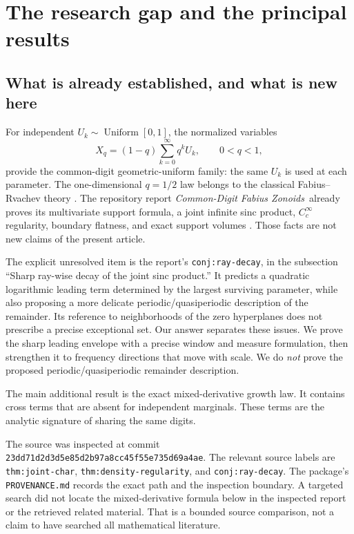 \documentclass[11pt,a4paper]{article}
\numberwithin{equation}{section}
\theoremstyle{definition}
\theoremstyle{remark}\newtheorem{remark}[theorem]{Remark}
\newcommand{\repo}{\textit{Common-Digit Fabius Zonoids}}
\begin{document}
\begingroup
\small
\setlength{\parskip}{0pt}
\tableofcontents
\endgroup
\clearpage

\section{The research gap and the principal results}
\label{sec:intro}

\subsection{What is already established, and what is new here}

For independent $U_k\sim\operatorname{Uniform}[0,1]$, the normalized variables
\begin{equation}
 X_q=(1-q)\sum_{k=0}^{\infty}q^kU_k,\qquad 0<q<1,
 \label{eq:normalized}
\end{equation}
provide the common-digit geometric-uniform family: the same $U_k$ is used at
each parameter. The one-dimensional $q=1/2$ law belongs to the classical
Fabius--Rvachev theory \cite{Fabius,Arias}. The repository report \repo\ already
proves its multivariate support formula, a joint infinite sinc product,
$C_c^\infty$ regularity, boundary flatness, and exact support volumes
\cite{Repo}. Those facts are not new claims of the present article.

The explicit unresolved item is the report's
\texttt{conj:ray-decay}, in the subsection ``Sharp ray-wise decay of the joint
sinc product.'' It predicts a quadratic logarithmic leading term determined
by the largest surviving parameter, while also proposing a more delicate
periodic/quasiperiodic description of the remainder. Its reference to
neighborhoods of the zero hyperplanes does not prescribe a precise exceptional
set. Our answer separates these issues. We prove the sharp leading envelope
with a precise window and measure formulation, then strengthen it to
frequency directions that move with scale. We do \emph{not} prove the proposed
periodic/quasiperiodic remainder description.

The main additional result is the exact mixed-derivative growth law. It
contains cross terms that are absent for independent marginals. These terms
are the analytic signature of sharing the same digits.

The source was inspected at commit \texttt{23dd71d2d3d5e85d2b97a8cc45f55e735d69a4ae}.
The relevant source labels are \texttt{thm:joint-char},
\texttt{thm:density-regularity}, and \texttt{conj:ray-decay}.
The package's \texttt{PROVENANCE.md} records the exact path and the inspection
boundary. A targeted search did not locate the mixed-derivative formula below
in the inspected report or the retrieved related material. That is a
bounded source comparison, not a claim to have searched all mathematical
literature.
\end{document}
